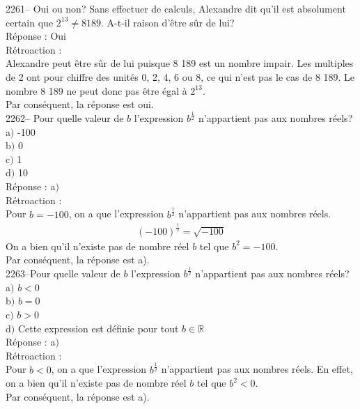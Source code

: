 \documentclass[letterpaper, 12pt]{article}
\begin{document}
2261-- Oui ou non? Sans effectuer de calculs, Alexandre dit qu'il est absolument certain que \mbox{$2^{13}\neq8 189$}. A-t-il raison d'\^etre s\^ur de lui?\\

R\'eponse : Oui\\

R\'etroaction :\\
Alexandre peut \^etre s\^ur de lui puisque 8 189 est un nombre impair. Les multiples de 2 ont pour chiffre des unit\'es 0, 2, 4, 6 ou 8, ce qui n'est pas le cas de 8 189. Le nombre 8 189 ne peut donc pas \^etre \'egal \`a $2^{13}$.\\
Par cons\'equent, la r\'eponse est oui.\\


2262--  Pour quelle valeur de $b$ l'expression $b^{\frac{1}{2}}$ n'appartient pas aux nombres r\'eels?\\

a$)$ -100\\
b$)$ 0\\
c$)$ 1\\
d$)$ 10\\

R\'eponse : a$)$\\

R\'etroaction :\\
Pour $b=-100$, on a que l'expression $b^{\frac{1}{2}}$ n'appartient pas aux nombres r\'eels.
\begin{eqnarray*}
(-100)^{\frac{1}{2}}=\sqrt{-100}
\end{eqnarray*}
On a bien qu'il n'existe pas de nombre r\'eel $b$ tel que
$b^{2}=-100$.\\
Par cons\'equent, la r\'eponse est a).\\

2263--Pour quelle valeur de $b$ l'expression $b^{\frac{1}{2}}$ n'appartient pas aux nombres r\'eels?\\

a$)$ $b<0$\\
b$)$ $b=0$\\
c$)$ $b>0$\\
d$)$ Cette expression est d\'efinie pour tout $b\in\mathbb{R}$\\

R\'eponse : a$)$\\

R\'etroaction :\\
Pour $b<0$, on a que l'expression $b^{\frac{1}{2}}$ n'appartient pas aux nombres r\'eels.
En effet, on a bien qu'il n'existe pas de nombre r\'eel $b$ tel que
$b^{2}<0$.\\
Par cons\'equent, la r\'eponse est a).\\
\end{document}

